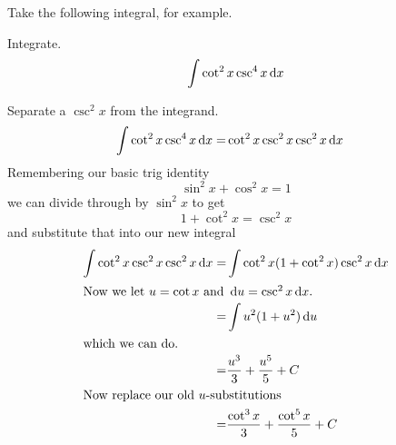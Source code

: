 Take the following integral, for example.
\begin{ex}
  Integrate.
  \[\int \cot^2x \csc^4x \,\mathrm{d} x \]
  \begin{sol}
    Separate a $\csc^2x$ from the integrand.
    \begin{align*}
      \int \cot^2x \csc^4x \,\mathrm{d} x
      =& \cot^2x \csc^2x \csc^2x \,\mathrm{d} x
    \end{align*}
    Remembering our basic trig identity
    \[ \sin^2x + \cos^2x = 1\]
    we can divide through by $\sin^2x$ to get
    \[ 1+\cot^2x=\csc^2x \]
    and substitute that into our new integral
    \begin{align*}
      \int\cot^2x\csc^2x\csc^2x\,\mathrm{d} x
      =& \int \cot^2x (1+\cot^2x)\csc^2x \,\mathrm{d} x \\
      \intertext{Now we let $u=\cot x$ and $\,\mathrm{d} u=\csc^2x \,\mathrm{d} x$.}
      =&\int u^2(1+u^2)\,\mathrm{d} u \\
      \intertext{which we can do.}
      =& \frac{u^3}{3}+\frac{u^5}{5}+C \\
      \intertext{Now replace our old $u$-substitutions}
      =& \frac{\cot^3x}{3}+\frac{\cot^5x}{5}+C
    \end{align*}
  \end{sol}
\end{ex}


%

